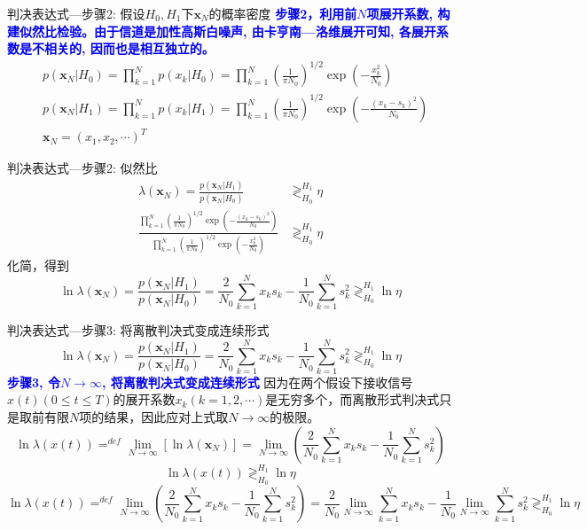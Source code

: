 \begin{frame}[shrink]{判决表达式---步骤2: 假设$H_0,H_1$下$\bm{x}_N$的概率密度}
\textbf{\textcolor{blue}{步骤2，利用前$N$项展开系数, 构建似然比检验。由于信道是加性高斯白噪声, 由卡亨南---洛维展开可知, 各展开系数是不相关的, 因而也是相互独立的。}}
\begin{align*}
&p(\bm{x}_N|H_0)=\prod_{k=1}^{N}p(x_k|H_0)=\prod_{k=1}^{N}\left(\frac{1}{\pi N_0}\right)^{1/2}\exp\left(-\frac{x_k^2}{N_0}\right)\\
&p(\bm{x}_N|H_1)=\prod_{k=1}^{N}p(x_k|H_1)=\prod_{k=1}^{N}\left(\frac{1}{\pi N_0}\right)^{1/2}\exp\left(-\frac{(x_k-s_k)^2}{N_0}\right)\\
&\bm{x}_N=(x_1,x_2,\cdots)^T
\end{align*}	
\end{frame}

\begin{frame}[shrink]{判决表达式---步骤2: 似然比}
\begin{align*}
\lambda(\bm{x}_N)=\frac{p(\bm{x}_N|H_1)}{p(\bm{x}_N|H_0)}&\mathop{\gtrless}_{H_0}^{H_1}\eta\\
\frac{\prod\limits_{k=1}^{N}\left(\frac{1}{\pi N_0}\right)^{1/2}\exp\left(-\frac{(x_k-s_k)^2}{N_0}\right)}
{\prod\limits_{k=1}^{N}\left(\frac{1}{\pi N_0}\right)^{1/2}\exp\left(-\frac{x_k^2}{N_0}\right)}&\mathop{\gtrless}_{H_0}^{H_1}\eta
\end{align*}
化简，得到
\[\ln\lambda(\bm{x}_N)=\frac{p(\bm{x}_N|H_1)}{p(\bm{x}_N|H_0)}=\frac{2}{N_0}\sum\limits_{k=1}^{N}x_ks_k-\frac{1}{N_0}\sum\limits_{k=1}^{N}s_k^2\mathop{\gtrless}_{H_0}^{H_1}\ln\eta \]
\end{frame}

\begin{frame}[shrink]{判决表达式---步骤3: 将离散判决式变成连续形式}
\[\ln\lambda(\bm{x}_N)=\frac{p(\bm{x}_N|H_1)}{p(\bm{x}_N|H_0)}=\frac{2}{N_0}\sum\limits_{k=1}^{N}x_ks_k-\frac{1}{N_0}\sum\limits_{k=1}^{N}s_k^2\mathop{\gtrless}_{H_0}^{H_1}\ln\eta \]
\textbf{\textcolor{blue}{步骤3, 令$N\to\infty$, 将离散判决式变成连续形式}}
因为在两个假设下接收信号$x(t)(0\le t\le T)$的展开系数$x_k(k=1,2,\cdots)$是无穷多个，而离散形式判决式只是取前有限$N$项的结果，因此应对上式取$N\to\infty$的极限。
\[\ln\lambda(x(t))\mathop{=}^{def}\lim\limits_{N\to\infty}[\ln\lambda(\bm{x}_N)]=\lim\limits_{N\to\infty}\left(\frac{2}{N_0}\sum\limits_{k=1}^{N}x_ks_k-\frac{1}{N_0}\sum\limits_{k=1}^{N}s_k^2\right) \]
\[\ln\lambda(x(t))\mathop{\gtrless}_{H_0}^{H_1}\ln\eta \]
\[\ln\lambda(x(t))\mathop{=}^{def}\lim\limits_{N\to\infty}\left(\frac{2}{N_0}\sum\limits_{k=1}^{N}x_ks_k-\frac{1}{N_0}\sum\limits_{k=1}^{N}s_k^2\right)=
\frac{2}{N_0}\lim\limits_{N\to\infty}\sum\limits_{k=1}^{N}x_ks_k-\frac{1}{N_0}\lim\limits_{N\to\infty}\sum\limits_{k=1}^{N}s_k^2\mathop{\gtrless}_{H_0}^{H_1}\ln\eta \]
\end{frame}

